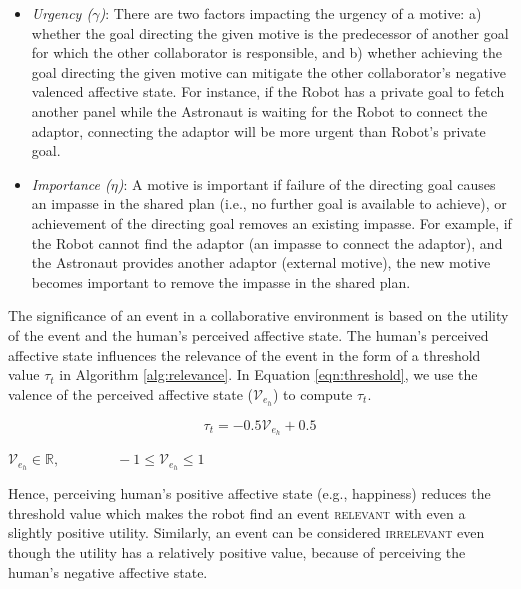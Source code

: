 \documentclass[12pt]{report}
\begin{document}
\begin{itemize}
  \setlength\itemsep{1mm}
  \item \textit{Urgency ($\gamma$)}: There are two factors impacting the urgency
  of a motive: a) whether the goal directing the given motive is the predecessor of
  another goal for which the other collaborator is responsible, and b) whether
  achieving the goal directing the given motive can mitigate the other
  collaborator's negative valenced affective state. For instance, if the Robot has a
  private goal to fetch another panel while the Astronaut is waiting for the
  Robot to connect the adaptor, connecting the adaptor will be more urgent than
  Robot's private goal.
  \item \textit{Importance ($\eta$)}: A motive is important if failure of the
  directing goal causes an impasse in the shared plan (i.e., no further goal is
  available to achieve), or achievement of the directing goal removes an
  existing impasse. For example, if the Robot cannot find the adaptor (an
  impasse to connect the adaptor), and the Astronaut provides another adaptor
  (external motive), the new motive becomes important to remove the impasse in
  the shared plan.
\end{itemize}

The significance of an event in a collaborative environment is based on the
utility of the event and the human's perceived affective state. The human's perceived
affective state influences the relevance of the event in the form of a threshold value
$\tau_{t}$ in Algorithm \ref{alg:relevance}. In Equation \ref{eqn:threshold}, we
use the valence of the perceived affective state ($\mathcal{V}_{e_h}$) to compute
$\tau_{t}$.

\begin{equation}
    \tau_{t}= 
       -0.5\mathcal{V}_{e_h} + 0.5
    \label{eqn:threshold}
\end{equation}

\begin{center} 
    $\mathcal{V}_{e_h} \in \mathbb{R}, \qquad\qquad -1 \leq \mathcal{V}_{e_h}
    \leq 1$
\end{center}

Hence, perceiving human's positive affective state (e.g., happiness) reduces the
threshold value which makes the robot find an event \textsc{relevant} with even
a slightly positive utility. Similarly, an event can be considered
\textsc{irrelevant} even though the utility has a relatively positive value,
because of perceiving the human's negative affective state.
\end{document}
